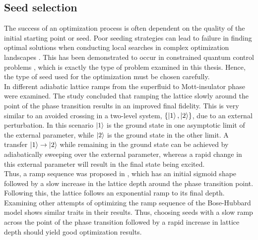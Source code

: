 \subsection{Seed selection}
The success of an optimization process is often dependent on the quality of the initial starting point or seed. Poor seeding strategies can lead to failure in finding optimal solutions when conducting local searches in complex optimization landscapes \cite{Sorensen2016}. This has been demonstrated to occur in constrained quantum control problems \cite{Zhdanov2015}, which is exactly the type of problem examined in this thesis. Hence, the type of seed used for the optimization must be chosen carefully.\\ 
In \cite{Zakrzewski2009} different adiabatic lattice ramps from the superfluid to Mott-insulator phase were examined. The study concluded that ramping the lattice slowly around the point of the phase transition results in an improved final fidelity. This is very similar to an avoided crossing in a two-level system, $\{ \ket{1} , \ket{2} \}$, due to an external perturbation. In this scenario $\ket{1}$ is the ground state in one asymptotic limit of the external parameter, while $\ket{2}$ is the ground state in the other limit. A transfer $\ket{1} \to \ket{2}$ while remaining in the ground state can be achieved by adiabatically sweeping over the external parameter, whereas a rapid change in this external parameter will result in the final state being excited.\\
Thus, a ramp sequence was proposed in \cite{Zakrzewski2009}, which has an initial sigmoid shape followed by a slow increase in the lattice depth around the phase transition point. Following this, the lattice follows an exponential ramp to its final depth. Examining other attempts of optimizing the ramp sequence of the Bose-Hubbard model \cite{Doria2011,FrankBloch} shows similar traits in their results. Thus, choosing seeds with a slow ramp across the point of the phase transition followed by a rapid increase in lattice depth should yield good optimization results.